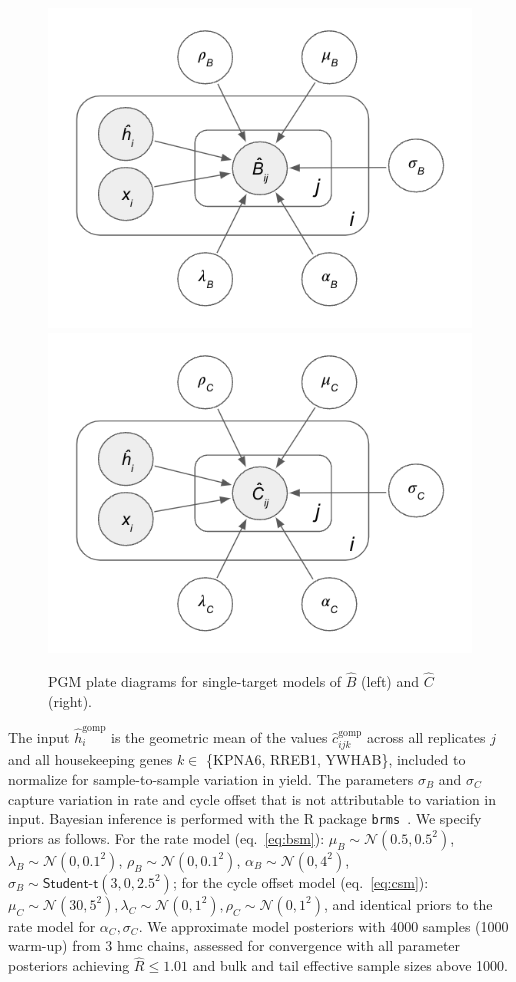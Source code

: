 \documentclass[../thesis.tex]{subfiles}
\begin{document}
\begin{figure}
    \centering
    \includegraphics[width=.45\textwidth]{figures/chapter2/LAMP_STM_B_PGM.png} \includegraphics[width=.45\textwidth]{figures/chapter2/LAMP_STM_C_PGM.png}
    \caption{PGM plate diagrams for single-target models of $\hat{B}$ (left) and $\hat{C}$ (right).}
    \label{fig:stm_pgms}
\end{figure}
The input $\hat{h}^{\text{gomp}}_{i}$ is the geometric mean of the values $\hat{c}_{ijk}^{\text{gomp}}$ across all replicates $j$ and all housekeeping genes  $k \in$ \{KPNA6, RREB1, YWHAB\}, included to normalize for sample-to-sample variation in  yield. The parameters $\sigma_B$ and $\sigma_C$ capture variation in rate and cycle offset that is not attributable to variation in  input. Bayesian inference is performed with the R package \texttt{brms}~\citep{burkner_brms_2017}. We specify priors as follows. For the rate model (eq.~\ref{eq:bsm}): $\mu_B \sim \mathcal{N}(0.5, 0.5^2)$, $\lambda_B \sim \mathcal{N}(0, 0.1^2)$, $\rho_B \sim \mathcal{N}(0, 0.1^2)$, $\alpha_B \sim \mathcal{N}(0,4^2)$, $\sigma_B \sim \textsf{Student-t}(3, 0, 2.5^2)$; for the cycle offset model (eq.~\ref{eq:csm}): $\mu_C \sim \mathcal{N}(30, 5^2), \lambda_C \sim \mathcal{N}(0, 1^2), \rho_C \sim \mathcal{N}(0, 1^2)$, and identical priors to the rate model for $\alpha_C,\sigma_C$. We approximate model posteriors with 4000 samples (1000 warm-up) from 3 \gls{hmc} chains, assessed for convergence with all parameter posteriors achieving $\hat{R} \leq 1.01$ and bulk and tail effective sample sizes above 1000.
\end{document}
